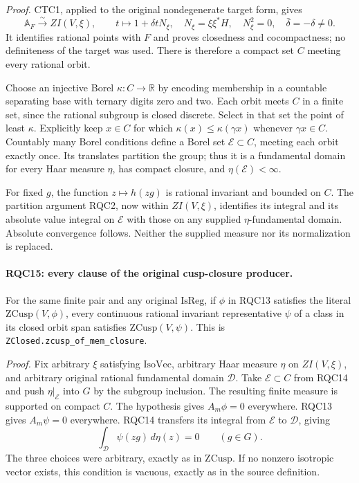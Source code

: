 \emph{Proof.}
CTC1, applied to the original nondegenerate target form, gives
\[
 \mathbb A_F\xrightarrow{\ \sim\ }ZI(V,\xi),\qquad
 t\longmapsto1+\delta tN_\xi,\quad
 N_\xi=\xi\xi^*H,\quad N_\xi^2=0,\quad
 \bar\delta=-\delta\ne0.
 \tag{RQC.20}
\]
It identifies rational points with \(F\) and proves closedness and
cocompactness; no definiteness of the target was used.  There is
therefore a compact set \(C\) meeting every rational orbit.

Choose an injective Borel \(\kappa:C\to\mathbb R\) by encoding
membership in a countable separating base with ternary digits
zero and two.  Each orbit meets \(C\) in a finite set, since the
rational subgroup is closed discrete.  Select in that set the
point of least \(\kappa\).  Explicitly keep \(x\in C\) for which
\(\kappa(x)\le\kappa(\gamma x)\) whenever \(\gamma x\in C\).
Countably many Borel conditions define a Borel set
\(\mathcal E\subset C\), meeting each orbit exactly once.
Its translates partition the group; thus it is a fundamental
domain for every Haar measure \(\eta\), has compact closure,
and \(\eta(\mathcal E)<\infty\).

For fixed \(g\), the function \(z\mapsto h(zg)\) is rational
invariant and bounded on \(C\).  The partition argument RQC2,
now within \(ZI(V,\xi)\), identifies its integral and its absolute
value integral on \(\mathcal E\) with those on any supplied
\(\eta\)-fundamental domain.  Absolute convergence follows.
Neither the supplied measure nor its normalization is replaced.

\paragraph{RQC15: every clause of the original cusp-closure producer.}
\label{claim:RQC15}
For the same finite pair and any original \(\mathrm{IsReg}\), if \(\phi\)
in RQC13 satisfies the literal \(\mathrm{ZCusp}(V,\phi)\), every
continuous rational invariant representative \(\psi\) of a class
in its closed orbit span satisfies \(\mathrm{ZCusp}(V,\psi)\).
This is \texttt{ZClosed.zcusp\_of\_mem\_closure}.

\emph{Proof.}
Fix arbitrary \(\xi\) satisfying \(\mathrm{IsoVec}\), arbitrary
Haar measure \(\eta\) on \(ZI(V,\xi)\), and arbitrary original
rational fundamental domain \(\mathcal D\).
Take \(\mathcal E\subset C\) from RQC14 and push
\(\eta|_{\mathcal E}\) into \(G\) by the subgroup inclusion.
The resulting finite measure is supported on compact \(C\).
The hypothesis gives \(A_m\phi=0\) everywhere.  RQC13 gives
\(A_m\psi=0\) everywhere.  RQC14 transfers its integral from
\(\mathcal E\) to \(\mathcal D\), giving
\[
 \int_{\mathcal D}\psi(zg)\,d\eta(z)=0\qquad(g\in G).
 \tag{RQC.21}
\]
The three choices were arbitrary, exactly as in \(\mathrm{ZCusp}\).
If no nonzero isotropic vector exists, this condition is vacuous,
exactly as in the source definition.

